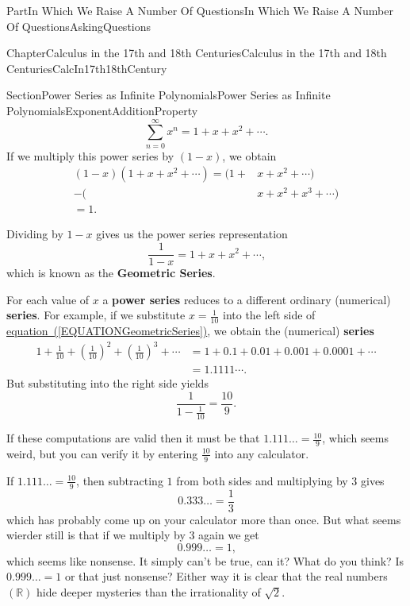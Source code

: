 \documentclass[oneside,10pt,]{book}
\newcommand{\xreffont}{\relax}
\newcommand{\terminology}[1]{\textbf{#1}}
\numberwithin{equation}{part}
\newcommand{\RR}{\mathbb {R}}
\newcommand{\amp}{&}
\begin{document}
\begin{partptx}{Part}{In Which We Raise A Number Of Questions}{}{In Which We Raise A Number Of Questions}{}{}{AskingQuestions}
\begin{chapterptx}{Chapter}{Calculus in the 17th and 18th Centuries}{}{Calculus in the 17th and 18th Centuries}{}{}{CalcIn17th18thCentury}
\begin{sectionptx}{Section}{Power Series as Infinite Polynomials}{}{Power Series as Infinite Polynomials}{}{}{ExponentAdditionProperty}
\begin{equation*}
\sum_{n=0}^\infty x^n=1+x+x^2+\cdots \text{.}
\end{equation*}
If we multiply this power series by \((1-x)\), we obtain%
\begin{align*}
(1-x)(1+x+x^2+\cdots)=(1+\amp{}x+x^2+\cdots)\\
-(\amp{}x+x^2+x^3+\cdots)\\
=1.\ \ \ \ \amp{}
\end{align*}
%
\par
Dividing by \(1-x\) gives us the power series representation%
\begin{equation}
\frac{1}{1-x}=1+x+x^2+\cdots\text{,}\label{EQUATIONGeometricSeries}
\end{equation}
which is known as the \terminology{Geometric Series}.%
\par
For each value of \(x\) a \terminology{power series} reduces to a different ordinary (numerical) \terminology{series}. For example, if we substitute \(x=\frac{1}{10}\) into the left side of \hyperref[EQUATIONGeometricSeries]{equation~({\xreffont\ref{EQUATIONGeometricSeries}})}, we obtain the (numerical) \terminology{series}%
\begin{align*}
1+\frac{1}{10}+\left(\frac{1}{10}\right)^2+\left(\frac{1}{10}\right)^3+
\cdots\amp{}=1+0.1+0.01+0.001+0.0001+\cdots\\
\amp{}=1.1111\cdots.
\end{align*}
But substituting into the right side yields%
\begin{equation*}
\frac{1}{1-\frac{1}{10}}=\frac{10}{9}. 
\end{equation*}
%
\par
If these computations are valid then it must be that \(1.111\ldots=\frac{10}{9}\), which seems weird, but you can verify it by entering \(\frac{10}{9}\) into any calculator.%
\par
If \(1.111\ldots=\frac{10}{9}\), then subtracting \(1\) from both sides and multiplying by \(3\) gives%
\begin{equation*}
0.333\ldots = \frac{1}{3}
\end{equation*}
which has probably come up on your calculator more than once. But what seems wierder still is that if we multiply by \(3\) again we get%
\begin{equation*}
0.999\ldots
=1\text{,}
\end{equation*}
which seems like nonsense. It simply can't be true, can it? What do you think? Is \(0.999\ldots =1\) or that just nonsense?  Either way it is clear that the real numbers \(\left(\RR\right) \) hide deeper mysteries than the irrationality of \(\sqrt{2}\).%

\end{sectionptx}
\end{chapterptx}
\end{partptx}
\end{document}
